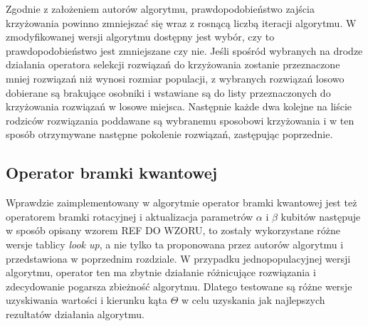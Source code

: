 Zgodnie z założeniem autorów algorytmu, prawdopodobieństwo zajścia krzyżowania powinno zmniejszać się wraz z rosnącą liczbą iteracji algorytmu. W zmodyfikowanej wersji algorytmu dostępny jest wybór, czy to prawdopodobieństwo jest zmniejszane czy nie. Jeśli spośród wybranych na drodze działania operatora selekcji rozwiązań do krzyżowania zostanie przeznaczone mniej rozwiązań niż wynosi rozmiar populacji, z wybranych rozwiązań losowo dobierane są brakujące osobniki i wstawiane są do listy przeznaczonych do krzyżowania rozwiązań w losowe miejsca. Następnie każde dwa kolejne na liście rodziców rozwiązania poddawane są wybranemu sposobowi krzyżowania i w ten sposób otrzymywane następne pokolenie rozwiązań, zastępując poprzednie.

\subsection{Operator bramki kwantowej}
Wprawdzie zaimplementowany w algorytmie operator bramki kwantowej jest też operatorem bramki rotacyjnej i aktualizacja parametrów $\alpha$ i $\beta$ kubitów następuje w sposób opisany wzorem REF DO WZORU, to zostały wykorzystane różne wersje tablicy \textit{look up}, a nie tylko ta proponowana przez autorów algorytmu i przedstawiona w poprzednim rozdziale. W przypadku jednopopulacyjnej wersji algorytmu, operator ten ma zbytnie działanie różnicujące rozwiązania i zdecydowanie pogarsza zbieżność algorytmu. Dlatego testowane są różne wersje uzyskiwania wartości i kierunku kąta $\Theta$ w celu uzyskania jak najlepszych rezultatów działania algorytmu.
